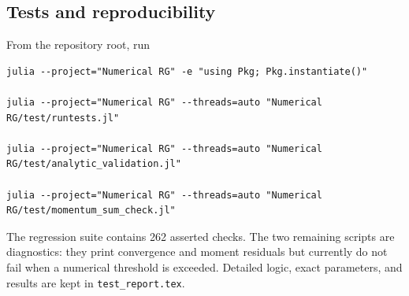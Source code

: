 \subsection{Tests and reproducibility}

From the repository root, run
\begin{lstlisting}
julia --project="Numerical RG" -e "using Pkg; Pkg.instantiate()"

julia --project="Numerical RG" --threads=auto "Numerical RG/test/runtests.jl"

julia --project="Numerical RG" --threads=auto "Numerical RG/test/analytic_validation.jl"

julia --project="Numerical RG" --threads=auto "Numerical RG/test/momentum_sum_check.jl"
\end{lstlisting}
The regression suite contains 262 asserted checks. The two remaining scripts
are diagnostics: they print convergence and moment residuals but currently do
not fail when a numerical threshold is exceeded. Detailed logic, exact
parameters, and results are kept in \texttt{test\_report.tex}.
